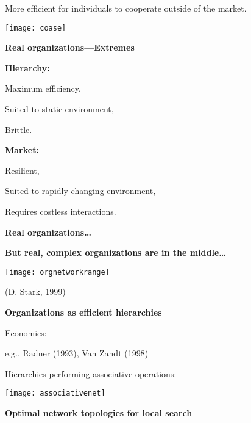       More efficient for individuals to cooperate outside of the market.
    
  

  \begin{center}
    \texttt{[image: coase]}
  \end{center}


  \textbf{Real organizations---Extremes}

  \textbf{Hierarchy:}
    
     
      Maximum efficiency,
     
      Suited to static environment,
     
      Brittle.
    
  

  \textbf{Market:}
    
    
      Resilient,
    
      Suited to rapidly changing environment,
    
      Requires costless interactions.
    
  


  \textbf{Real organizations\ldots}

  \textbf{But real, complex organizations are in the middle\ldots}
    \begin{center}
      \texttt{[image: orgnetworkrange]}
    \end{center}
    
    
       (D. Stark, 1999)\cite{stark1999a}
    
  



  \textbf{Organizations as efficient hierarchies}

  
    
    
      Economics: 
    
      e.g., Radner (1993)\cite{radner1993a}, Van Zandt (1998)\cite{vanzandt1998a}
    
      Hierarchies performing associative operations:
      \begin{center}
        \texttt{[image: associativenet]}
      \end{center}
    
  


  \textbf{Optimal network topologies for local search}


